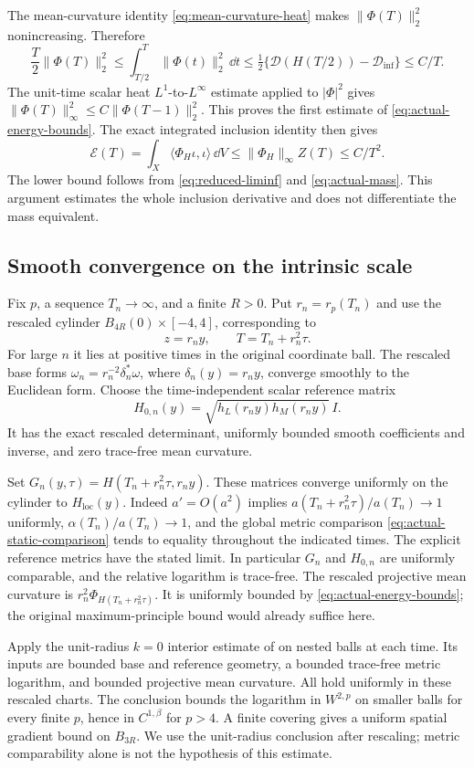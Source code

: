 The mean-curvature identity \eqref{eq:mean-curvature-heat}
makes \(\|\Phi(T)\|_2^2\) nonincreasing. Therefore
\[
 \frac T2\|\Phi(T)\|_2^2
 \le\int_{T/2}^T\|\Phi(t)\|_2^2\,\dd t
 \le\tfrac12\{\mathcal D(H(T/2))-\mathcal D_{\inf}\}
 \le C/T .
\]
The unit-time scalar heat \(L^1\)-to-\(L^\infty\) estimate
applied to \(|\Phi|^2\) gives
\(\|\Phi(T)\|_\infty^2\le C\|\Phi(T-1)\|_2^2\).
This proves the first estimate of
\eqref{eq:actual-energy-bounds}.
The exact integrated inclusion identity then gives
\[
 \mathcal E(T)
 =\int_X\langle\Phi_H\iota,\iota\rangle\,\dd V
 \le\|\Phi_H\|_\infty Z(T)\le C/T^2 .
\]
The lower bound follows from \eqref{eq:reduced-liminf}
and \eqref{eq:actual-mass}. This argument estimates the
whole inclusion derivative and does not differentiate
the mass equivalent.

\subsection{Smooth convergence on the intrinsic scale}

Fix \(p\), a sequence \(T_n\to\infty\), and a finite
\(R>0\). Put \(r_n=r_p(T_n)\) and use the rescaled
cylinder \(B_{4R}(0)\times[-4,4]\), corresponding to
\[
 z=r_ny,\qquad T=T_n+r_n^2\tau .
\]
For large \(n\) it lies at positive times in the
original coordinate ball. The rescaled base forms
\(\omega_n=r_n^{-2}\delta_n^*\omega\), where
\(\delta_n(y)=r_ny\), converge smoothly to the
Euclidean form. Choose the time-independent scalar
reference matrix
\[
 H_{0,n}(y)=\sqrt{h_L(r_ny)h_M(r_ny)}\,I .
\]
It has the exact rescaled determinant, uniformly
bounded smooth coefficients and inverse, and zero
trace-free mean curvature.

Set \(G_n(y,\tau)=H(T_n+r_n^2\tau,r_ny)\).
These matrices converge uniformly on the cylinder
to \(H_{\mathrm{loc}}(y)\). Indeed \(a'=O(a^2)\)
implies \(a(T_n+r_n^2\tau)/a(T_n)\to1\) uniformly,
\(\alpha(T_n)/a(T_n)\to1\), and the global metric
comparison \eqref{eq:actual-static-comparison} tends
to equality throughout the indicated times.
The explicit reference metrics have the stated limit.
In particular \(G_n\) and \(H_{0,n}\) are uniformly
comparable, and the relative logarithm is trace-free.
The rescaled projective mean curvature is
\(r_n^2\Phi_{H(T_n+r_n^2\tau)}\). It is uniformly
bounded by \eqref{eq:actual-energy-bounds}; the original
maximum-principle bound would already suffice here.

Apply the unit-radius \(k=0\) interior estimate of
\cite[Appendix~C, Theorem~C.1 and Proposition~C.2]{JacobWalpuski18}
on nested balls at each time. Its inputs are bounded
base and reference geometry, a bounded trace-free
metric logarithm, and bounded projective mean curvature.
All hold uniformly in these rescaled charts. The
conclusion bounds the logarithm in \(W^{2,p}\) on
smaller balls for every finite \(p\), hence in
\(C^{1,\beta}\) for \(p>4\). A finite covering gives
a uniform spatial gradient bound on \(B_{3R}\).
We use the unit-radius conclusion after rescaling;
metric comparability alone is not the hypothesis
of this estimate.

